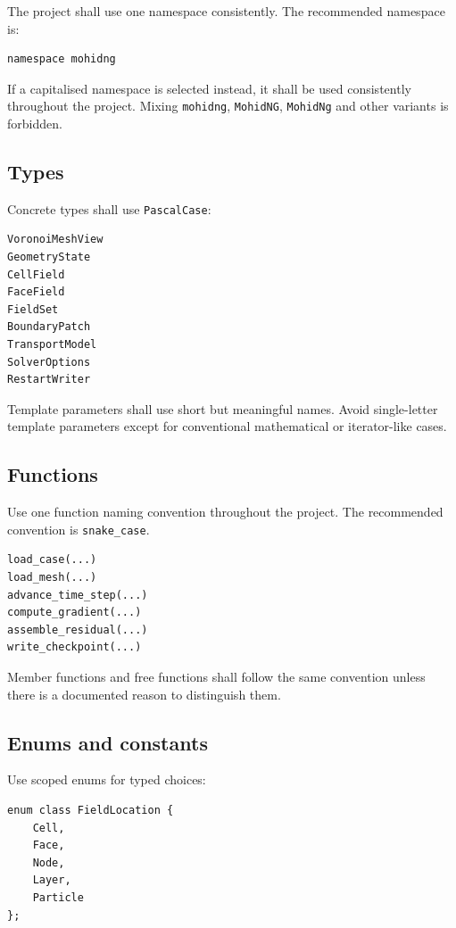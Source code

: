 \documentclass[11pt,a4paper]{article}
\newcommand{\code}[1]{\texttt{#1}}
\begin{document}
The project shall use one namespace consistently. The recommended namespace is:

\begin{lstlisting}[style=mohidcpp]
namespace mohidng
\end{lstlisting}

If a capitalised namespace is selected instead, it shall be used consistently throughout the project. Mixing \code{mohidng}, \code{MohidNG}, \code{MohidNg} and other variants is forbidden.

\subsection{Types}

Concrete types shall use \code{PascalCase}:

\begin{lstlisting}[style=mohidcpp]
VoronoiMeshView
GeometryState
CellField
FaceField
FieldSet
BoundaryPatch
TransportModel
SolverOptions
RestartWriter
\end{lstlisting}

Template parameters shall use short but meaningful names. Avoid single-letter template parameters except for conventional mathematical or iterator-like cases.

\subsection{Functions}

Use one function naming convention throughout the project. The recommended convention is \code{snake\_case}.

\begin{lstlisting}[style=mohidcpp]
load_case(...)
load_mesh(...)
advance_time_step(...)
compute_gradient(...)
assemble_residual(...)
write_checkpoint(...)
\end{lstlisting}

Member functions and free functions shall follow the same convention unless there is a documented reason to distinguish them.

\subsection{Enums and constants}

Use scoped enums for typed choices:

\begin{lstlisting}[style=mohidcpp]
enum class FieldLocation {
    Cell,
    Face,
    Node,
    Layer,
    Particle
};
\end{lstlisting}
\end{document}
